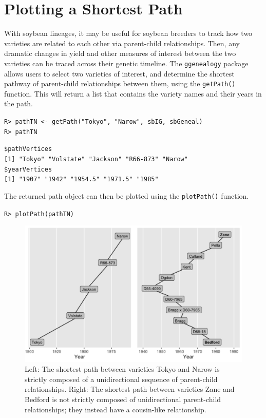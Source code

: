 \documentclass[11pt,a4paper,oldfontcommands,openany]{memoir}
\DeclareRobustCommand{\mybox}[2][gray!15]{%
\begin{tcolorbox}[   %
        breakable,
        left=0pt,
        right=0pt,
        top=0pt,
        bottom=0pt,
        colback=#1,
        colframe=#1,
        width=\dimexpr\textwidth\relax, 
        enlarge left by=0mm,
        boxsep=5pt,
        arc=0pt,outer arc=0pt,
        ]
        #2
\end{tcolorbox}
}
\numberwithin{equation}{section} %
\newcommand{\code}[1]{{\texttt{#1}}}
\newcommand{\pkg}[1]{{\texttt{#1}}}
\begin{document}
\section{Plotting a Shortest Path}

With soybean lineages, it may be useful for soybean breeders to track how two varieties are related to each other via parent-child relationships. Then, any dramatic changes in yield and other measures of interest between the two varieties can be traced across their genetic timeline. The \pkg{ggenealogy} package allows users to select two varieties of interest, and determine the shortest pathway of parent-child relationships between them, using the \code{getPath()} function. This will return a list that contains the variety names and their years in the path.

\mybox{
\texttt{R> pathTN <- getPath("Tokyo", "Narow", sbIG, sbGeneal)}\\
\texttt{R> pathTN}
}

\mybox[green!10]{
\texttt{\$pathVertices}\\
\texttt{[1] "Tokyo"    "Volstate" "Jackson"  "R66-873"  "Narow"}\\   

\texttt{\$yearVertices}\\
\texttt{[1] "1907"   "1942"   "1954.5" "1971.5" "1985"}
}

The returned path object can then be plotted using the \code{plotPath()} function.

\mybox{
\texttt{R> plotPath(pathTN)}
}

\begin{figure}[h]
    \centering
    \includegraphics[width=\textwidth]{pathTNZB}
    \caption{Left: The shortest path between varieties Tokyo and Narow is strictly composed of a unidirectional sequence of parent-child relationships. Right: The shortest path between varieties Zane and Bedford is not strictly composed of unidirectional parent-child relationships; they instead have a cousin-like relationship.}
    \label{fig:pathTNZB}
\end{figure}
\end{document}
